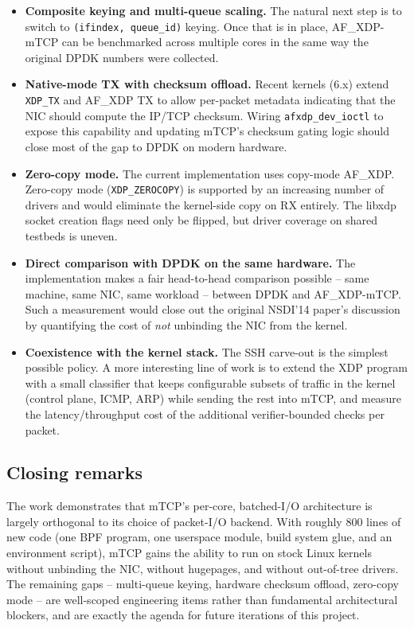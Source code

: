 \documentclass[10pt, letterpaper, twocolumn]{article}
\begin{document}
\begin{itemize}
    \item \textbf{Composite keying and multi-queue scaling.} The natural next step is to switch to \texttt{(ifindex, queue\_id)} keying. Once that is in place, AF\_XDP-mTCP can be benchmarked across multiple cores in the same way the original DPDK numbers were collected.
    \item \textbf{Native-mode TX with checksum offload.} Recent kernels (6.x) extend \texttt{XDP\_TX} and AF\_XDP TX to allow per-packet metadata indicating that the NIC should compute the IP/TCP checksum. Wiring \texttt{afxdp\_dev\_ioctl} to expose this capability and updating mTCP's checksum gating logic should close most of the gap to DPDK on modern hardware.
    \item \textbf{Zero-copy mode.} The current implementation uses copy-mode AF\_XDP. Zero-copy mode (\texttt{XDP\_ZEROCOPY}) is supported by an increasing number of drivers and would eliminate the kernel-side copy on RX entirely. The libxdp socket creation flags need only be flipped, but driver coverage on shared testbeds is uneven.
    \item \textbf{Direct comparison with DPDK on the same hardware.} The implementation makes a fair head-to-head comparison possible -- same machine, same NIC, same workload -- between DPDK and AF\_XDP-mTCP. Such a measurement would close out the original NSDI'14 paper's discussion by quantifying the cost of \textit{not} unbinding the NIC from the kernel.
    \item \textbf{Coexistence with the kernel stack.} The SSH carve-out is the simplest possible policy. A more interesting line of work is to extend the XDP program with a small classifier that keeps configurable subsets of traffic in the kernel (control plane, ICMP, ARP) while sending the rest into mTCP, and measure the latency/throughput cost of the additional verifier-bounded checks per packet.
\end{itemize}

\subsection{Closing remarks}

The work demonstrates that mTCP's per-core, batched-I/O architecture is largely orthogonal to its choice of packet-I/O backend. With roughly 800 lines of new code (one BPF program, one userspace module, build system glue, and an environment script), mTCP gains the ability to run on stock Linux kernels without unbinding the NIC, without hugepages, and without out-of-tree drivers. The remaining gaps -- multi-queue keying, hardware checksum offload, zero-copy mode -- are well-scoped engineering items rather than fundamental architectural blockers, and are exactly the agenda for future iterations of this project.
\end{document}
